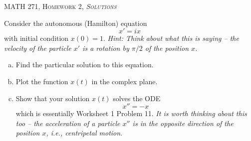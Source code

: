 \documentclass[12pt]{article} %
\begin{document}
\begin{center}
   \textsc{\large MATH 271, Homework 2, \emph{Solutions}}\\
\end{center}
\vspace{.5cm}

\begin{problem}
Consider the autonomous (Hamilton) equation
\[
	x'=ix
\]
with initial condition $x(0)=1$. \emph{Hint: Think about what this is saying -- the velocity of the particle $x'$ is a rotation by $\pi/2$ of the position $x$.}
\begin{enumerate}[(a)]
	\item Find the particular solution to this equation.
	\item Plot the function $x(t)$ in the complex plane.
	\item Show that your solution $x(t)$ solves the ODE
	\[
		x'' = - x
	\]
	which is essentially Worksheet 1 Problem 11. \emph{It is worth thinking about this too -- the acceleration of a particle $x''$ is in the opposite direction of the position $x$, i.e., centripetal motion.}
\end{enumerate}
\end{problem}
\end{document}
